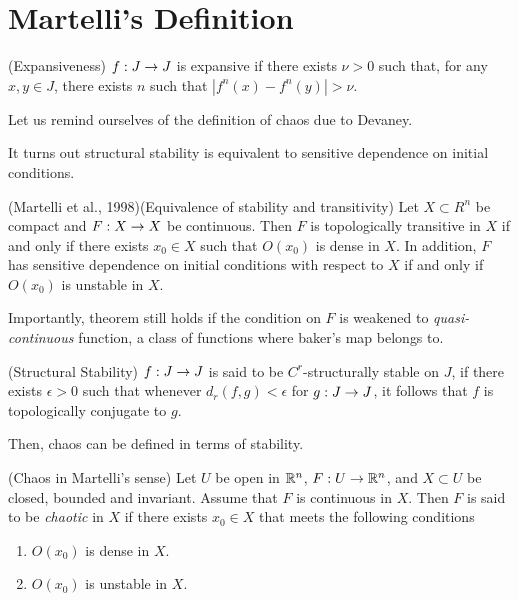 \documentclass[11pt]{book}
\begin{document}
\section{Martelli's Definition}

\begin{definition}
  (Expansiveness) $f: J\rightarrow J$ is expansive if there exists $\nu > 0$
  such that, for any $x,y\in J$, there exists $n$ such that
  $|f^{n}(x)-f^{n}(y)| > \nu$.
\end{definition}

Let us remind ourselves of the definition of chaos due to Devaney.

It turns out structural stability is equivalent to sensitive dependence on initial conditions.
\begin{proposition}
  (Martelli et al., 1998)(Equivalence of stability and transitivity)
  Let $X\subset R^n$ be compact and $F: X\rightarrow X$ be continuous.
  Then $F$ is topologically transitive in $X$ if and only if there exists $x_0\in X$ such that $O(x_0)$ is dense in $X$.
  In addition, $F$ has sensitive dependence on initial conditions with respect to $X$ if and only if $O(x_0)$ is unstable in $X$.
\end{proposition}

Importantly, theorem still holds if the condition on $F$ is weakened to {\it quasi-continuous} function, a class of functions where baker's map belongs to.

\begin{definition}
  (Structural Stability) $f: J \rightarrow J$ is said to be $C^r$-structurally
  stable on $J$, if there exists $\epsilon > 0$ such that whenever
  $d_r(f,g) < \epsilon$ for $g: J\rightarrow J$, it follows that $f$
  is topologically conjugate to $g$.
\end{definition}

Then, chaos can be defined in terms of stability.

\begin{definition}
  (Chaos in Martelli's sense)
  Let $U$ be open in $\mathbb{R}^n$, $F: U \to \mathbb{R}^n$, and $X\subset U$ be closed, bounded and invariant.
  Assume that $F$ is continuous in $X$.
  Then $F$ is said to be \textit{chaotic} in $X$ if there exists $x_0 \in X$ that meets the following conditions
  \begin{enumerate}
    \item $O(x_0)$ is dense in $X$.
    \item $O(x_0)$ is unstable in $X$.
  \end{enumerate}
  \label{defn:chaosmartelli}
\end{definition}
\end{document}
